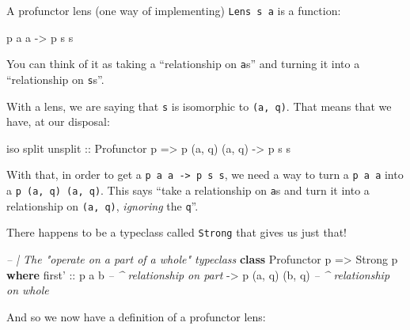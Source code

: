 \documentclass[]{article}
\newenvironment{Shaded}{}{}
\newcommand{\CommentTok}[1]{\textcolor[rgb]{0.38,0.63,0.69}{\textit{#1}}}
\newcommand{\DataTypeTok}[1]{\textcolor[rgb]{0.56,0.13,0.00}{#1}}
\newcommand{\KeywordTok}[1]{\textcolor[rgb]{0.00,0.44,0.13}{\textbf{#1}}}
\newcommand{\NormalTok}[1]{#1}
\newcommand{\OtherTok}[1]{\textcolor[rgb]{0.00,0.44,0.13}{#1}}
\begin{document}
A profunctor lens (one way of implementing)
\texttt{Lens\textquotesingle{}\ s\ a} is a function:

\begin{Shaded}
\begin{Highlighting}[]
\NormalTok{p a a }\OtherTok{->}\NormalTok{ p s s}
\end{Highlighting}
\end{Shaded}

You can think of it as taking a ``relationship on \texttt{a}s'' and turning it
into a ``relationship on \texttt{s}s''.

With a lens, we are saying that \texttt{s} is isomorphic to \texttt{(a,\ q)}.
That means that we have, at our disposal:

\begin{Shaded}
\begin{Highlighting}[]
\NormalTok{iso split unsplit}
\OtherTok{    ::} \DataTypeTok{Profunctor}\NormalTok{ p}
    \OtherTok{=>}\NormalTok{ p (a, q) (a, q)}
    \OtherTok{->}\NormalTok{ p s s}
\end{Highlighting}
\end{Shaded}

With that, in order to get a \texttt{p\ a\ a\ -\textgreater{}\ p\ s\ s}, we need
a way to turn a \texttt{p\ a\ a} into a \texttt{p\ (a,\ q)\ (a,\ q)}. This says
``take a relationship on \texttt{a}s and turn it into a relationship on
\texttt{(a,\ q)}, \emph{ignoring} the \texttt{q}''.

There happens to be a typeclass called \texttt{Strong} that gives us just that!

\begin{Shaded}
\begin{Highlighting}[]
\CommentTok{-- | The "operate on a part of a whole" typeclass}
\KeywordTok{class} \DataTypeTok{Profunctor}\NormalTok{ p }\OtherTok{=>} \DataTypeTok{Strong}\NormalTok{ p }\KeywordTok{where}
\NormalTok{    first'}
\OtherTok{        ::}\NormalTok{ p a b                }\CommentTok{-- ^ relationship on part}
        \OtherTok{->}\NormalTok{ p (a, q) (b, q)      }\CommentTok{-- ^ relationship on whole}
\end{Highlighting}
\end{Shaded}

And so we now have a definition of a profunctor lens:
\end{document}
